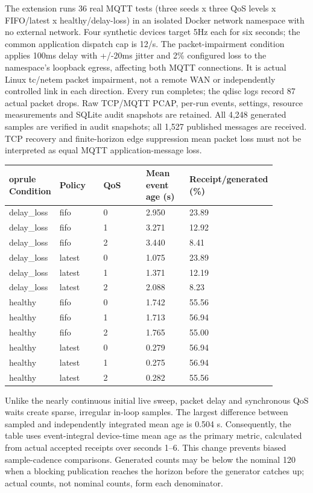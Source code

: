 \documentclass[11pt,a4paper]{article}
\begin{document}
The extension runs 36 real MQTT tests (three seeds x three QoS levels x FIFO/latest x healthy/delay-loss) in an isolated Docker network namespace with no external network. Four synthetic devices target 5Hz each for six seconds; the common application dispatch cap is 12/s. The packet-impairment condition applies 100ms delay with +/-20ms jitter and 2\% configured loss to the namespace's loopback egress, affecting both MQTT connections. It is actual Linux tc/netem packet impairment, not a remote WAN or independently controlled link in each direction. Every run completes; the qdisc logs record 87 actual packet drops. Raw TCP/MQTT PCAP, per-run events, settings, resource measurements and SQLite audit snapshots are retained. All 4,248 generated samples are verified in audit snapshots; all 1,527 published messages are received. TCP recovery and finite-horizon edge suppression mean packet loss must not be interpreted as equal MQTT application-message loss.


\begingroup\small\setlength{\tabcolsep}{3pt}\begin{longtable}{p{0.176\linewidth}p{0.176\linewidth}p{0.176\linewidth}p{0.176\linewidth}p{0.176\linewidth}}	oprule
Condition & Policy & QoS & Mean event age (s) & Receipt/generated (\%) \\
\midrule\endhead
delay\_loss & fifo & 0 & 2.950 & 23.89 \\
delay\_loss & fifo & 1 & 3.271 & 12.92 \\
delay\_loss & fifo & 2 & 3.440 & 8.41 \\
delay\_loss & latest & 0 & 1.075 & 23.89 \\
delay\_loss & latest & 1 & 1.371 & 12.19 \\
delay\_loss & latest & 2 & 2.088 & 8.23 \\
healthy & fifo & 0 & 1.742 & 55.56 \\
healthy & fifo & 1 & 1.713 & 56.94 \\
healthy & fifo & 2 & 1.765 & 55.00 \\
healthy & latest & 0 & 0.279 & 56.94 \\
healthy & latest & 1 & 0.275 & 56.94 \\
healthy & latest & 2 & 0.282 & 55.56 \\
\bottomrule\end{longtable}\endgroup

Unlike the nearly continuous initial live sweep, packet delay and synchronous QoS waits create sparse, irregular in-loop samples. The largest difference between sampled and independently integrated mean age is 0.504 s. Consequently, the table uses event-integral device-time mean age as the primary metric, calculated from actual accepted receipts over seconds 1--6. This change prevents biased sample-cadence comparisons. Generated counts may be below the nominal 120 when a blocking publication reaches the horizon before the generator catches up; actual counts, not nominal counts, form each denominator.
\end{document}

